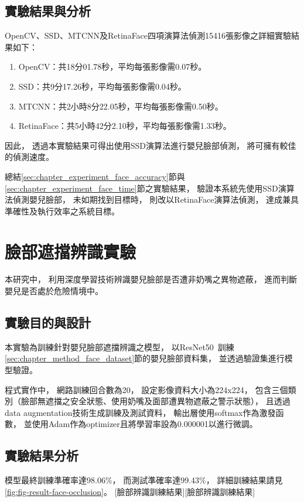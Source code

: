 \documentclass[class=NCU_thesis, crop=false]{standalone}
\begin{document}
\subsection{實驗結果與分析}
OpenCV、SSD、MTCNN及RetinaFace四項演算法偵測15416張影像之詳細實驗結果如下：
\begin{enumerate}
    \item OpenCV：共18分01.78秒，平均每張影像需0.07秒。
    \item SSD：共9分17.26秒，平均每張影像需0.04秒。
    \item MTCNN：共2小時8分22.05秒，平均每張影像需0.50秒。
    \item RetinaFace：共5小時42分2.10秒，平均每張影像需1.33秒。
\end{enumerate}

因此，
透過本實驗結果可得出使用SSD演算法進行嬰兒臉部偵測，
將可擁有較佳的偵測速度。

總結\ref{sec:chapter_experiment_face_accuracy}節與\ref{sec:chapter_experiment_face_time}節之實驗結果，
驗證本系統先使用SSD演算法偵測嬰兒臉部，
未如期找到目標時，
則改以RetinaFace演算法偵測，
達成兼具準確性及執行效率之系統目標。

\section{臉部遮擋辨識實驗}
本研究中，
利用深度學習技術辨識嬰兒臉部是否遭非奶嘴之異物遮蔽，
進而判斷嬰兒是否處於危險情境中。

\subsection{實驗目的與設計}
本實驗為訓練針對嬰兒臉部遮擋辨識之模型，
以ResNet50~\cite{he_deep_2016}訓練\ref{sec:chapter_method_face_dataset}節的嬰兒臉部資料集，
並透過驗證集進行模型驗證。

程式實作中，
網路訓練回合數為20，
設定影像資料大小為224x224，
包含三個類別（臉部無遮擋之安全狀態、使用奶嘴及面部遭異物遮蔽之警示狀態），
且透過data augmentation技術生成訓練及測試資料，
輸出層使用softmax作為激發函數，
並使用Adam作為optimizer且將學習率設為0.000001以進行微調。

\subsection{實驗結果分析}
模型最終訓練準確率達98.06\%，
而測試準確率達99.43\%，
詳細訓練結果請見\cref{fig:fig-result-face-occlusion}。
[臉部辨識訓練結果][臉部辨識訓練結果]
\end{document}
